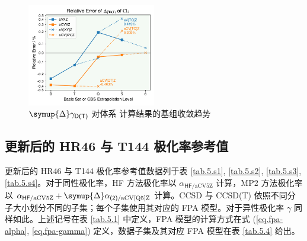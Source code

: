 \begin{figure}[ht]
    \centering
    \includegraphics[width=0.5\textwidth]{assets/Cl2-aniso.pdf}
    \caption{$\symup{\Delta} \gamma_\textsf{D(T)}$ 对体系  计算结果的基组收敛趋势}
    \label{fig.Cl2-aniso}
\end{figure}

\newpage

\subsection{更新后的 HR46 与 T144 极化率参考值}

更新后的 HR46 与 T144 极化率参考值数据列于表 \ref{tab.5.s1}, \ref{tab.5.s2}, \ref{tab.5.s3}, \ref{tab.5.s4}。对于同性极化率，HF 方法极化率以 $\alpha_{\textsf{HF}/\text{aCV5Z}}$ 计算，MP2 方法极化率以 $\alpha_{\textsf{HF}/\text{aCV5Z}} + \symup{\Delta} \alpha_{\textsf{(2)}/\text{aCV[Q5]Z}}$ 计算。CCSD 与 CCSD(T) 依照不同分子大小划分不同的子集；每个子集使用其对应的 FPA 模型。对于异性极化率 $\gamma$ 同样如此。上述记号在表 \ref{tab.5.1} 中定义，FPA 模型的计算方式在式 (\ref{eq.fpa-alpha}, \ref{eq.fpa-gamma}) 定义，数据子集及其对应 FPA 模型在表 \ref{tab.5.4} 给出。

\begingroup
\setlength{\LTleft}{-20cm plus -1fill}
\setlength{\LTright}{\LTleft}

